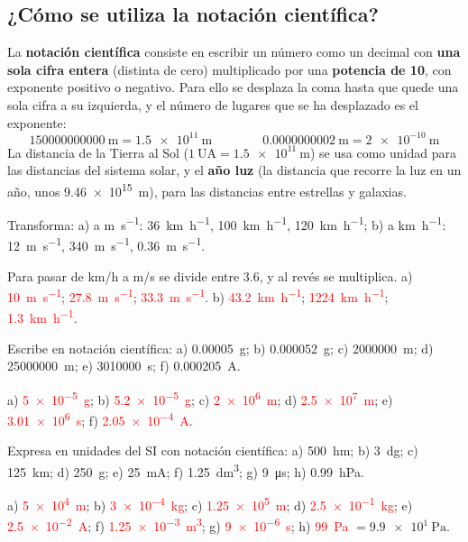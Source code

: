 \subsection{¿Cómo se utiliza la notación científica?}

La \textbf{notación científica} consiste en escribir un número como un decimal con \textbf{una sola cifra entera} (distinta de cero) multiplicado por una \textbf{potencia de 10}, con exponente positivo o negativo. Para ello se desplaza la coma hasta que quede una sola cifra a su izquierda, y el número de lugares que se ha desplazado es el exponente:
\[ \qty{150000000000}{\m} = \qty{1.5e11}{\m} \qquad\qquad \qty{0.0000000002}{\m} = \qty{2e-10}{\m} \]
La distancia de la Tierra al Sol (\(1~\text{UA} = \qty{1.5e11}{\m}\)) se usa como unidad para las distancias del sistema solar, y el \textbf{año luz} (la distancia que recorre la luz en un año, unos \qty{9.46e15}{\m}), para las distancias entre estrellas y galaxias.

\begin{exercise}
    Transforma: a) a \unit{\m\per\s}: \qty{36}{\km\per\hour}, \qty{100}{\km\per\hour}, \qty{120}{\km\per\hour}; b) a \unit{\km\per\hour}: \qty{12}{\m\per\s}, \qty{340}{\m\per\s}, \qty{0.36}{\m\per\s}.
    \begin{solu}
        Para pasar de km/h a m/s se divide entre \num{3.6}, y al revés se multiplica.
        a) \textcolor{red}{\qty{10}{\m\per\s}}; \textcolor{red}{\qty{27.8}{\m\per\s}}; \textcolor{red}{\qty{33.3}{\m\per\s}}.
        b) \textcolor{red}{\qty{43.2}{\km\per\hour}}; \textcolor{red}{\qty{1224}{\km\per\hour}}; \textcolor{red}{\qty{1.3}{\km\per\hour}}.
    \end{solu}
\end{exercise}

\begin{exercise}
    Escribe en notación científica: a) \qty{0.00005}{\gram}; b) \qty{0.000052}{\gram}; c) \qty{2000000}{\m}; d) \qty{25000000}{\m}; e) \qty{3010000}{\s}; f) \qty{0.000205}{\ampere}.
    \begin{solu}
        a) \textcolor{red}{\qty{5e-5}{\gram}}; b) \textcolor{red}{\qty{5.2e-5}{\gram}}; c) \textcolor{red}{\qty{2e6}{\m}}; d) \textcolor{red}{\qty{2.5e7}{\m}}; e) \textcolor{red}{\qty{3.01e6}{\s}}; f) \textcolor{red}{\qty{2.05e-4}{\ampere}}.
    \end{solu}
\end{exercise}

\begin{exercise}
    Expresa en unidades del SI con notación científica: a) \qty{500}{\hecto\m}; b) \qty{3}{\deci\gram}; c) \qty{125}{\km}; d) \qty{250}{\gram}; e) \qty{25}{\mA}; f) \qty{1.25}{\cubic\dm}; g) \qty{9}{\us}; h) \qty{0.99}{\hecto\pascal}.
    \begin{solu}
        a) \textcolor{red}{\qty{5e4}{\m}}; b) \textcolor{red}{\qty{3e-4}{\kg}}; c) \textcolor{red}{\qty{1.25e5}{\m}}; d) \textcolor{red}{\qty{2.5e-1}{\kg}}; e) \textcolor{red}{\qty{2.5e-2}{\ampere}}; f) \textcolor{red}{\qty{1.25e-3}{\cubic\m}}; g) \textcolor{red}{\qty{9e-6}{\s}}; h) \textcolor{red}{\qty{99}{\pascal}} \(= \qty{9.9e1}{\pascal}\).
    \end{solu}
\end{exercise}

